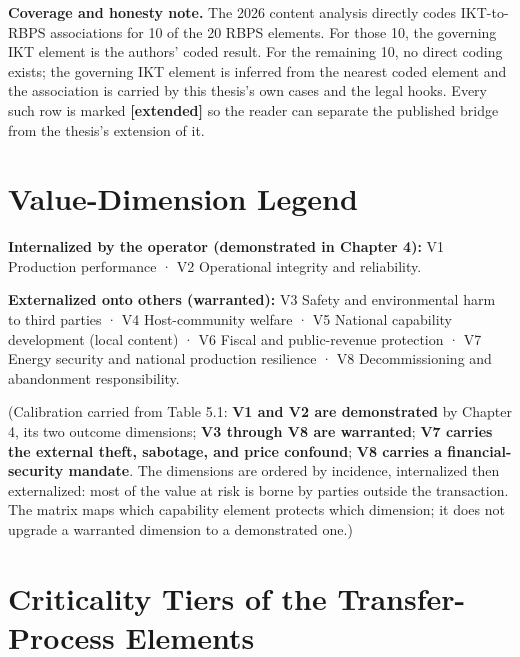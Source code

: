 \textbf{Coverage and honesty note.} The 2026 content analysis directly
codes IKT-to-RBPS associations for 10 of the 20 RBPS elements. For those
10, the governing IKT element is the authors' coded result. For the
remaining 10, no direct coding exists; the governing IKT element is
inferred from the nearest coded element and the association is carried
by this thesis's own cases and the legal hooks. Every such row is marked
\textbf{{[}extended{]}} so the reader can separate the published bridge
from the thesis's extension of it.

\hypertarget{value-dimension-legend}{%
\section{Value-Dimension Legend}\label{value-dimension-legend}}

\textbf{Internalized by the operator (demonstrated in Chapter 4):} V1
Production performance · V2 Operational integrity and reliability.

\textbf{Externalized onto others (warranted):} V3 Safety and
environmental harm to third parties · V4 Host-community welfare · V5
National capability development (local content) · V6 Fiscal and
public-revenue protection · V7 Energy security and national production
resilience · V8 Decommissioning and abandonment responsibility.

(Calibration carried from Table 5.1: \textbf{V1 and V2 are demonstrated}
by Chapter 4, its two outcome dimensions; \textbf{V3 through V8 are
warranted}; \textbf{V7 carries the external theft, sabotage, and price
confound}; \textbf{V8 carries a financial-security mandate}. The
dimensions are ordered by incidence, internalized then externalized:
most of the value at risk is borne by parties outside the transaction.
The matrix maps which capability element protects which dimension; it
does not upgrade a warranted dimension to a demonstrated one.)

\hypertarget{criticality-tiers-of-the-transfer-process-elements}{%
\section{Criticality Tiers of the Transfer-Process
Elements}\label{criticality-tiers-of-the-transfer-process-elements}}

